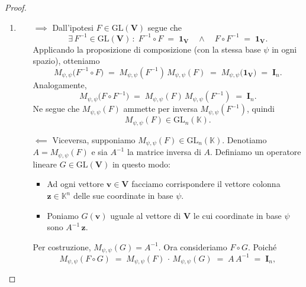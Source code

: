 \documentclass{article}
\theoremstyle{plain}
\theoremstyle{definition}
\theoremstyle{remark}
\begin{document}
\begin{proof}\hfill
\begin{enumerate}
    \item 
    \begin{itemize}
        \item[$\implies$] 
            Dall'ipotesi \(F\in \mathrm{GL}(\mathbf{V})\) segue che 
            \[
            \exists\,F^{-1}\in \mathrm{GL}(\mathbf{V})\,:\;
              F^{-1}\circ F \;=\; \mathbf{1_V}
              \quad\land\quad
              F\circ F^{-1} \;=\; \mathbf{1_V}.
            \]
            Applicando la proposizione di composizione (con la stessa base \(\psi\) in ogni spazio), otteniamo
            \[
              M_{\psi,\psi}\bigl(F^{-1}\circ F\bigr)
              \;=\;
              M_{\psi,\psi}(F^{-1})\,M_{\psi,\psi}(F)
              \;=\;
              M_{\psi,\psi}\bigl(\mathbf{1_V}\bigr)
              \;=\;
              \mathbf{I}_n.
            \]
            Analogamente,
            \[
              M_{\psi,\psi}\bigl(F\circ F^{-1}\bigr)
              \;=\;
              M_{\psi,\psi}(F)\,M_{\psi,\psi}(F^{-1})
              \;=\;
              \mathbf{I}_n.
            \]
            Ne segue che \(M_{\psi,\psi}(F)\) ammette per inversa \(M_{\psi,\psi}(F^{-1})\), quindi 
            \[
              M_{\psi,\psi}(F)\in \mathrm{GL}_n(\mathbb{K}).
            \]
        \item[$\impliedby$] 
            Viceversa, supponiamo \(M_{\psi,\psi}(F)\in \mathrm{GL}_n(\mathbb{K})\). Denotiamo $A = M_{\psi,\psi}(F)$
            e sia \(A^{-1}\) la matrice inversa di \(A\). Definiamo un operatore lineare $G\in \mathrm{GL}(\mathbf{V})$
            in questo modo:
            \begin{itemize}
              \item Ad ogni vettore \(\mathbf{v}\in \mathbf{V}\) facciamo corrispondere il vettore colonna \(\mathbf{z}\in \mathbb{K}^n\) delle sue coordinate in base \(\psi\).
              \item Poniamo \(G(\mathbf{v})\) uguale al vettore di \(\mathbf{V}\) le cui coordinate in base \(\psi\) sono \(A^{-1}\,\mathbf{z}\).
            \end{itemize}
            Per costruzione, \(M_{\psi,\psi}(G) = A^{-1}\). Ora consideriamo 
            \(
              F\circ G
            \). Poiché 
            \[
              M_{\psi,\psi}(F\circ G)
              \;=\;
              M_{\psi,\psi}(F)\,\cdot\,M_{\psi,\psi}(G)
              \;=\;
              A\,A^{-1}
              \;=\;
              \mathbf{I}_n,
\]
\end{itemize}
\end{enumerate}
\end{proof}
\end{document}
